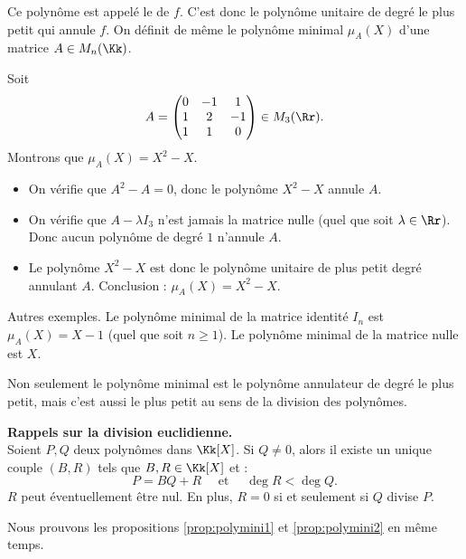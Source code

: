 \documentclass[12pt, class=report,crop=false]{standalone}
\begin{document}
Ce polynôme est appelé le  de $f$.
C'est donc le polynôme unitaire de degré le plus petit qui annule $f$.
On définit de même le polynôme minimal $\mu_A(X)$ d'une matrice $A \in M_n(\Kk)$.


\begin{exemple}
Soit 
\[
A = 
\begin{pmatrix}
0 & -1 & 1 \\
1 & 2 & -1 \\
1 & 1 & 0
\end{pmatrix} \in M_3(\Rr).\]
Montrons que $\mu_A(X) = X^2-X$.
\begin{itemize}	
  \item On vérifie que $A^2-A = 0$, donc le polynôme $X^2-X$ annule $A$.
  
  \item On vérifie que $A-\lambda I_3$ n'est jamais la matrice nulle (quel que soit $\lambda \in \Rr$). Donc aucun polynôme de degré $1$ n’annule $A$.
  
  \item Le polynôme $X^2-X$ est donc le polynôme unitaire de plus petit degré annulant $A$. Conclusion : $\mu_A(X) = X^2-X$.
\end{itemize}
\end{exemple} 

Autres exemples. Le polynôme minimal de la matrice identité $I_n$ est $\mu_A(X) = X -1$ (quel que soit $n\ge1$). Le polynôme minimal de la matrice nulle est $X$.

\bigskip

Non seulement le polynôme minimal est le polynôme annulateur de degré le plus petit,
mais c'est aussi le plus petit au sens de la division des polynômes.
\begin{proposition}
\label{prop:polymini2}
\sauteligne
{} 
\end{proposition}

\textbf{Rappels sur la division euclidienne.}\\
Soient $P,Q$ deux polynômes dans $\Kk[X]$. Si $Q \neq 0$, alors il existe un unique couple $(B,R)$ tels que $B,R \in \Kk[X]$ et :
\[P=BQ+R \quad \text{ et } \quad \deg R < \deg Q.\]
$R$ peut éventuellement être  nul. En plus, $R=0$ si et seulement si $Q$ divise $P$.


Nous prouvons les propositions \ref{prop:polymini1} et \ref{prop:polymini2} en même temps.
\end{document}
